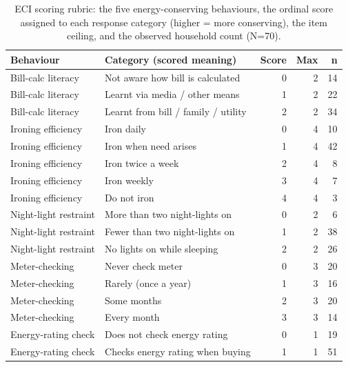 \begin{table}
\caption{ECI scoring rubric: the five energy-conserving behaviours, the ordinal score assigned to each response category (higher = more conserving), the item ceiling, and the observed household count (N=70).}
\label{tab:05_eci_rubric}
\begin{tabular}{llrrr}
\toprule
Behaviour & Category (scored meaning) & Score & Max & n \\
\midrule
Bill-calc literacy & Not aware how bill is calculated & 0 & 2 & 14 \\
Bill-calc literacy & Learnt via media / other means & 1 & 2 & 22 \\
Bill-calc literacy & Learnt from bill / family / utility & 2 & 2 & 34 \\
Ironing efficiency & Iron daily & 0 & 4 & 10 \\
Ironing efficiency & Iron when need arises & 1 & 4 & 42 \\
Ironing efficiency & Iron twice a week & 2 & 4 & 8 \\
Ironing efficiency & Iron weekly & 3 & 4 & 7 \\
Ironing efficiency & Do not iron & 4 & 4 & 3 \\
Night-light restraint & More than two night-lights on & 0 & 2 & 6 \\
Night-light restraint & Fewer than two night-lights on & 1 & 2 & 38 \\
Night-light restraint & No lights on while sleeping & 2 & 2 & 26 \\
Meter-checking & Never check meter & 0 & 3 & 20 \\
Meter-checking & Rarely (once a year) & 1 & 3 & 16 \\
Meter-checking & Some months & 2 & 3 & 20 \\
Meter-checking & Every month & 3 & 3 & 14 \\
Energy-rating check & Does not check energy rating & 0 & 1 & 19 \\
Energy-rating check & Checks energy rating when buying & 1 & 1 & 51 \\
\bottomrule
\end{tabular}
\end{table}

